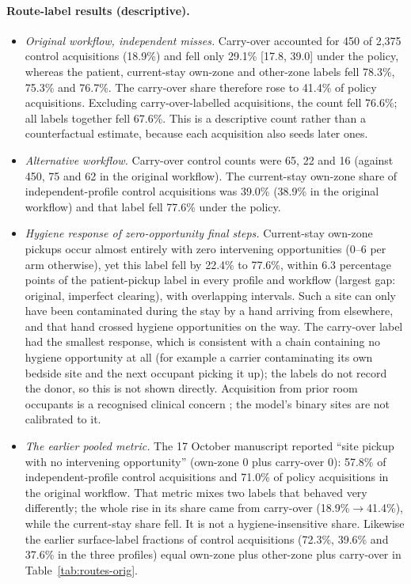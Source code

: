 \paragraph{Route-label results (descriptive).}
\begin{itemize}
\item \emph{Original workflow, independent misses.} Carry-over accounted for 450
of 2,375 control acquisitions (18.9\%) and fell only 29.1\% [17.8, 39.0] under
the policy, whereas the patient, current-stay own-zone and other-zone labels
fell 78.3\%, 75.3\% and 76.7\%. The carry-over share therefore rose to 41.4\% of
policy acquisitions. Excluding carry-over-labelled acquisitions, the count fell
76.6\%; all labels together fell 67.6\%. This is a descriptive count rather than a
counterfactual estimate, because each acquisition also seeds later ones.
\item \emph{Alternative workflow.} Carry-over control counts were 65, 22 and 16
(against 450, 75 and 62 in the original workflow). The current-stay own-zone
share of independent-profile control acquisitions was 39.0\% (38.9\% in the
original workflow) and that label fell 77.6\% under the policy.
\item \emph{Hygiene response of zero-opportunity final steps.} Current-stay own-zone pickups occur almost entirely with
zero intervening opportunities (0--6 per arm otherwise), yet this label fell by
22.4\% to 77.6\%, within 6.3 percentage points of the patient-pickup label in
every profile and workflow (largest gap: original, imperfect clearing), with
overlapping intervals. Such a site can only have been contaminated during the
stay by a hand arriving from elsewhere, and that hand crossed hygiene
opportunities on the way. The carry-over label had the smallest response, which
is consistent with a chain containing no hygiene opportunity at all (for example
a carrier contaminating its own bedside site and the next occupant picking it
up); the labels do not record the donor, so this is not shown directly.
Acquisition from prior room occupants is a recognised clinical concern
\citep{mitchell2015}; the model's binary sites are not calibrated to it.
\item \emph{The earlier pooled metric.} The 17 October manuscript reported
``site pickup with no intervening opportunity'' (own-zone 0 plus carry-over 0):
57.8\% of independent-profile control acquisitions and 71.0\% of policy
acquisitions in the original workflow. That metric mixes two labels that behaved
very differently; the whole rise in its share came from carry-over
(18.9\%$\to$41.4\%), while the current-stay share fell. It is not a
hygiene-insensitive share. Likewise the earlier surface-label fractions of
control acquisitions (72.3\%, 39.6\% and 37.6\% in the three profiles) equal
own-zone plus other-zone plus carry-over in Table~\ref{tab:routes-orig}.
\end{itemize}

